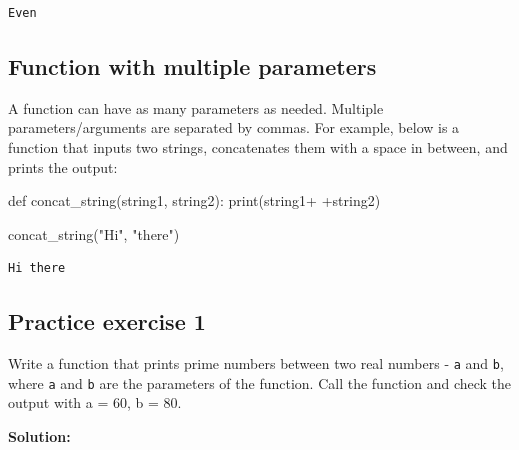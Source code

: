 \documentclass[
  letterpaper,
  DIV=11,
  numbers=noendperiod]{scrreprt}
\newenvironment{Shaded}{\begin{snugshade}}{\end{snugshade}}
\newcommand{\BuiltInTok}[1]{\textcolor[rgb]{0.00,0.23,0.31}{#1}}
\newcommand{\KeywordTok}[1]{\textcolor[rgb]{0.00,0.23,0.31}{#1}}
\newcommand{\NormalTok}[1]{\textcolor[rgb]{0.00,0.23,0.31}{#1}}
\newcommand{\OperatorTok}[1]{\textcolor[rgb]{0.37,0.37,0.37}{#1}}
\newcommand{\StringTok}[1]{\textcolor[rgb]{0.13,0.47,0.30}{#1}}
\begin{document}
\begin{verbatim}
Even
\end{verbatim}

\hypertarget{function-with-multiple-parameters}{%
\subsection{Function with multiple
parameters}\label{function-with-multiple-parameters}}

A function can have as many parameters as needed. Multiple
parameters/arguments are separated by commas. For example, below is a
function that inputs two strings, concatenates them with a space in
between, and prints the output:

\begin{Shaded}
\begin{Highlighting}[]
\KeywordTok{def}\NormalTok{ concat\_string(string1, string2):}
    \BuiltInTok{print}\NormalTok{(string1}\OperatorTok{+}\StringTok{\textquotesingle{} \textquotesingle{}}\OperatorTok{+}\NormalTok{string2)}
\end{Highlighting}
\end{Shaded}

\begin{Shaded}
\begin{Highlighting}[]
\NormalTok{concat\_string(}\StringTok{"Hi"}\NormalTok{, }\StringTok{"there"}\NormalTok{)}
\end{Highlighting}
\end{Shaded}

\begin{verbatim}
Hi there
\end{verbatim}

\hypertarget{practice-exercise-1-2}{%
\subsection{Practice exercise 1}\label{practice-exercise-1-2}}

Write a function that prints prime numbers between two real numbers -
\texttt{a} and \texttt{b}, where \texttt{a} and \texttt{b} are the
parameters of the function. Call the function and check the output with
a = 60, b = 80.

\textbf{Solution:}
\end{document}
